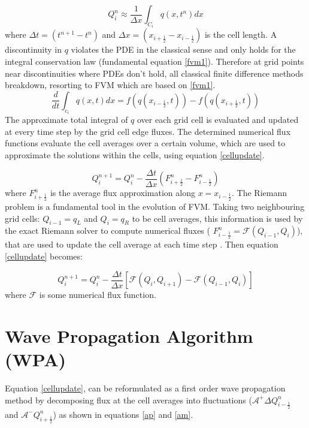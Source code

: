 \documentclass[12pt,a4paper]{article}
\newcommand{\donna}[1]{{\color{red}{#1}}}
\begin{document}
	\begin{equation}
		Q_{i}^{n} \approx \dfrac{1}{\Delta x} \int_{C_{i}}q(x,t^{n})dx
		\label{wpa0}
	\end{equation}
	   where $\Delta t = (t^{n+1} - t^{n})$ and  $\Delta x = (x_{i+\frac{1}{2}} - x_{i-\frac{1}{2}})$ is the cell length. A discontinuity in $q$ violates the PDE in the classical sense and only holds for the integral conservation law (fundamental equation \eqref{fvm1}). Therefore at grid points near discontinuities where PDEs don't hold, all classical finite difference methods breakdown, resorting to FVM which are based on \eqref{fvm1}. 	
	\begin{equation}
		\frac{d}{dt} \int_{c_{i}} q(x,t)dx = f(q(x_{i-\frac{1}{2}},t)) -  f(q(x_{i+\frac{1}{2}},t))
		\label{fvm1}
	\end{equation}	
	The approximate  total integral of $q$ over each grid cell is evaluated and updated at every time step by the grid cell edge fluxes. The determined numerical flux functions evaluate the  cell averages over a certain volume, which are used to approximate the solutions within the cells, using equation \eqref{cellupdate}.
	
	\begin{equation}
		Q_{i}^{n+1} = Q_{i}^{n} - \frac{\Delta t}{\Delta x} (F_{i+\frac{1}{2}}^{n} - F_{i-\frac{1}{2}}^{n})
		\label{cellupdate}
	\end{equation}	
	  where $F_{i+\frac{1}{2}}^{n} $ is the average flux approximation along $x=x_{i-\frac{1}{2}}$.
	The Riemann problem is a fundamental tool in the evolution of FVM. Taking two neighbouring grid cells: $Q_{i-1} = q_{L}$ and $Q_{i} = q_{R}$ to be cell averages, this information is used by the exact Riemann solver to compute numerical fluxes ( $F_{i-\frac{1}{2}}^{n} = \mathcal{F}(Q_{i-1} , Q_{i} )$), that are used to update the cell average at each time step \cite{ba-le-mi-ro:2003}. Then equation \eqref{cellupdate} becomes:
	
	\begin{equation}
		Q_{i}^{n+1} = Q_{i}^{n} - \frac{\Delta t}{\Delta x} \left[ \mathcal{F}(Q_{i} , Q_{i+1} ) - \mathcal{F}(Q_{i-1} , Q_{i} ) \right]
		\label{cellupdat}
	\end{equation}
	where $\mathcal{F}$ is some numerical flux function.\\
	
	\section{Wave Propagation Algorithm (WPA)}
	  \donna{reference book and papers}
	  Equation \eqref{cellupdate}, can be reformulated as a first order wave propagation method by decomposing flux at the cell averages into fluctuations ($\mathcal{A^{+}}\Delta 	Q_{i-\frac{1}{2}}^{n}$ and  $\mathcal{A^{-}}Q_{i+\frac{1}{2}}^{n}$) as shown in equations \eqref{ap} and \eqref{am}. 
	
\end{document}
